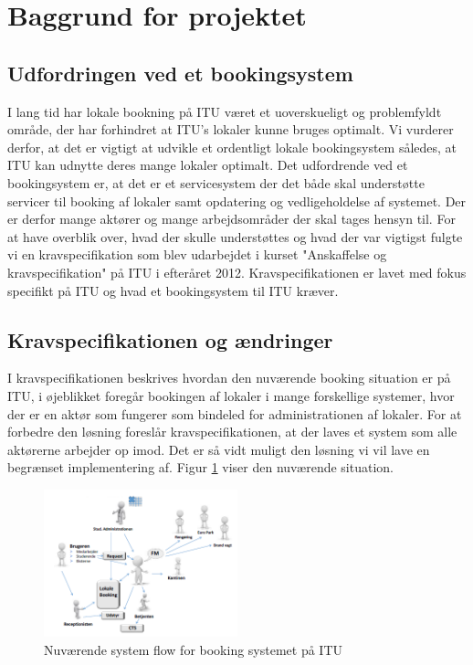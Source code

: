 \chapter{Baggrund for projektet}
\section{Udfordringen ved et bookingsystem}
\label{Baggrund_Udfording}
I lang tid har lokale bookning på ITU været et uoverskueligt og problemfyldt område, der har forhindret at ITU's lokaler kunne bruges optimalt. Vi vurderer derfor, at det er vigtigt at udvikle et ordentligt lokale bookingsystem således, at ITU kan udnytte deres mange lokaler optimalt. Det udfordrende ved et bookingsystem er, at det er et servicesystem der det både skal understøtte servicer til booking af lokaler samt opdatering og vedligeholdelse af systemet. Der er derfor mange aktører og mange arbejdsområder der skal tages hensyn til. For at have overblik over, hvad der skulle understøttes og hvad der var vigtigst fulgte vi en kravspecifikation som blev udarbejdet i kurset "Anskaffelse og kravspecifikation" på ITU i efteråret 2012. Kravspecifikationen er lavet med fokus specifikt på ITU og hvad et bookingsystem til ITU kræver.
\section{Kravspecifikationen og ændringer}
\label{Baggrund_kravspecifikationen}
I kravspecifikationen beskrives hvordan den nuværende booking situation er på ITU, i øjeblikket foregår bookingen af lokaler i mange forskellige systemer, hvor der er en aktør som fungerer som bindeled for administrationen af lokaler. For at forbedre den løsning foreslår kravspecifikationen, at der laves et system som alle aktørerne arbejder op imod. Det er så vidt muligt den løsning vi vil lave en begrænset implementering af. Figur \ref{} viser den nuværende situation.

\begin{figure}[h!]
  \centering
    \includegraphics[width=0.5\textwidth]{Appendix/GUI-Prototype/NuvaerendeFlow}
  \caption{Nuværende system flow for booking systemet på ITU}
\label{Baggrund_kravspecifikationen_NuvaerendeFlow}
\end{figure}

